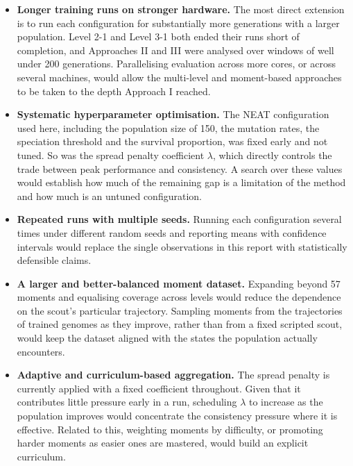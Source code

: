 \begin{itemize}
    \item \textbf{Longer training runs on stronger hardware.} The most direct
    extension is to run each configuration for substantially more generations
    with a larger population. Level 2-1 and Level 3-1 both ended their runs
    short of completion, and Approaches II and III were analysed over windows
    of well under 200 generations. Parallelising evaluation across more cores,
    or across several machines, would allow the multi-level and moment-based
    approaches to be taken to the depth Approach I reached.

    \item \textbf{Systematic hyperparameter optimisation.} The NEAT
    configuration used here, including the population size of 150, the
    mutation rates, the speciation threshold and the survival proportion, was
    fixed early and not tuned. So was the spread penalty coefficient
    $\lambda$, which directly controls the trade between peak performance and
    consistency. A search over these values would establish how much of the
    remaining gap is a limitation of the method and how much is an untuned
    configuration.

    \item \textbf{Repeated runs with multiple seeds.} Running each
    configuration several times under different random seeds and reporting
    means with confidence intervals would replace the single observations in
    this report with statistically defensible claims.

    \item \textbf{A larger and better-balanced moment dataset.} Expanding
    beyond 57 moments and equalising coverage across levels would reduce the
    dependence on the scout's particular trajectory. Sampling moments from the
    trajectories of trained genomes as they improve, rather than from a fixed
    scripted scout, would keep the dataset aligned with the states the
    population actually encounters.

    \item \textbf{Adaptive and curriculum-based aggregation.} The spread
    penalty is currently applied with a fixed coefficient throughout. Given
    that it contributes little pressure early in a run, scheduling $\lambda$ to
    increase as the population improves would concentrate the consistency
    pressure where it is effective. Related to this, weighting moments by
    difficulty, or promoting harder moments as easier ones are mastered, would
    build an explicit curriculum.


\end{itemize}
